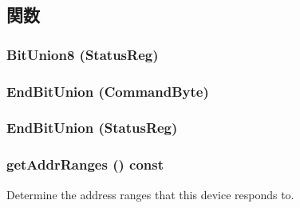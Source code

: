 \subsection{関数}
\hypertarget{classX86ISA_1_1I8042_ac0c09369d67be3737e41443fac983e6a}{
\subsubsection[{BitUnion8}]{\setlength{\rightskip}{0pt plus 5cm}BitUnion8 (StatusReg)}}
\label{classX86ISA_1_1I8042_ac0c09369d67be3737e41443fac983e6a}
\hypertarget{classX86ISA_1_1I8042_ad32329bafc0b040cc55ed2025f6ed478}{
\subsubsection[{EndBitUnion}]{\setlength{\rightskip}{0pt plus 5cm}EndBitUnion (CommandByte)}}
\label{classX86ISA_1_1I8042_ad32329bafc0b040cc55ed2025f6ed478}
\hypertarget{classX86ISA_1_1I8042_a1da145de36668df00f37d59c90f5eae2}{
\subsubsection[{EndBitUnion}]{\setlength{\rightskip}{0pt plus 5cm}EndBitUnion (StatusReg)}}
\label{classX86ISA_1_1I8042_a1da145de36668df00f37d59c90f5eae2}
\hypertarget{classX86ISA_1_1I8042_a36cf113d5e5e091ebddb32306c098fae}{
\subsubsection[{getAddrRanges}]{ getAddrRanges () const}}
\label{classX86ISA_1_1I8042_a36cf113d5e5e091ebddb32306c098fae}
Determine the address ranges that this device responds to.

